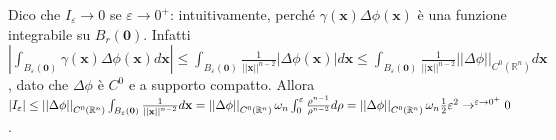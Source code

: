 \documentclass{article}
\begin{document}
Dico che $I_{\varepsilon }\rightarrow 0$ se $\varepsilon \rightarrow 0^{+}$:
intuitivamente, perch\'{e} $\gamma \left( \mathbf{x}\right) \Delta \phi
\left( \mathbf{x}\right) $ \`{e} una funzione integrabile su $B_{r}\left( 
\mathbf{0}\right) $. Infatti $\left\vert \int_{B_{\varepsilon }\left( 
\mathbf{0}\right) }\gamma \left( \mathbf{x}\right) \Delta \phi \left( 
\mathbf{x}\right) d\mathbf{x}\right\vert \leq \int_{B_{\varepsilon }\left( 
\mathbf{0}\right) }\frac{1}{\left\vert \left\vert \mathbf{x}\right\vert
\right\vert ^{n-2}}\left\vert \Delta \phi \left( \mathbf{x}\right)
\right\vert d\mathbf{x\leq }\int_{B_{\varepsilon }\left( \mathbf{0}\right) }%
\frac{1}{\left\vert \left\vert \mathbf{x}\right\vert \right\vert ^{n-2}}%
\left\vert \left\vert \Delta \phi \right\vert \right\vert _{C^{0}\left( 
\mathbb{R}
^{n}\right) }d\mathbf{x}$, dato che $\Delta \phi $ \`{e} $C^{0}$ e a
supporto compatto. Allora $\left\vert I_{\varepsilon }\right\vert \leq
\left\vert \left\vert \Delta \phi \right\vert \right\vert _{C^{0}\left( 
\mathbb{R}
^{n}\right) }\int_{B_{\varepsilon }\left( \mathbf{0}\right) }\frac{1}{%
\left\vert \left\vert \mathbf{x}\right\vert \right\vert ^{n-2}}d\mathbf{x}%
=\left\vert \left\vert \Delta \phi \right\vert \right\vert _{C^{0}\left( 
\mathbb{R}
^{n}\right) }\omega _{n}\int_{0}^{\varepsilon }\frac{\rho ^{n-1}}{\rho ^{n-2}%
}d\rho =\left\vert \left\vert \Delta \phi \right\vert \right\vert
_{C^{0}\left( 
\mathbb{R}
^{n}\right) }\omega _{n}\frac{1}{2}\varepsilon ^{2}\rightarrow ^{\varepsilon
\rightarrow 0^{+}}0$.
\end{document}
